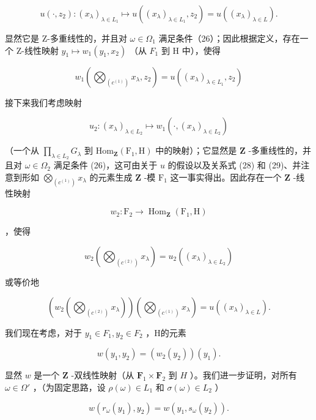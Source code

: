\[
u \left(\cdot , z _ {2}\right): \left(x _ {\lambda}\right) _ {\lambda \in L _ {1}} \mapsto u \left(\left(x _ {\lambda}\right) _ {\lambda \in L _ {1}}, z _ {2}\right) = u \left(\left(x _ {\lambda}\right) _ {\lambda \in L}\right).\tag{28}
\]

显然它是 Z-多重线性的，并且对 \(\omega\in\Omega_{1}\) 满足条件（26）；因此根据定义，存在一个 Z-线性映射 \(y_{1}\mapsto w_{1}(y_{1},x_{2})\) （从 \(F_{1}\) 到 H 中），使得

\[
w _ {1} \left(\bigotimes_ {(c ^ {(1)})} x _ {\lambda}, z _ {2}\right) = u \left(\left(x _ {\lambda}\right) _ {\lambda \in L _ {1}}, z _ {2}\right)\tag{29}
\]

接下来我们考虑映射

\[
u _ {2}: (x _ {\lambda}) _ {\lambda \in L _ {2}} \mapsto w _ {1} (\cdot , (x _ {\lambda}) _ {\lambda \in L _ {2}})
\]

（一个从 \(\prod_{\lambda \in L_2} G_\lambda\) 到 \(\mathrm{Hom}_{\mathbf{Z}}(\mathrm{F}_1, \mathrm{H})\) 中的映射）；它显然是 \(\mathbf{Z}\) -多重线性的，并且对 \(\omega \in \Omega_2\) 满足条件 (26)，这可由关于 \(u\) 的假设以及关系式 (28) 和 (29)、并注意到形如 \(\bigotimes_{(c^{(1)})} x_\lambda\) 的元素生成 \(\mathbf{Z}\) -模 \(\mathrm{F}_1\) 这一事实得出。因此存在一个 \(\mathbf{Z}\) -线性映射

\[
w _ {2}: \mathrm{F} _ {2} \rightarrow \operatorname{Hom} _ {\mathbf {Z}} (\mathrm{F} _ {1}, \mathrm{H})
\]

，使得

\[
w _ {2} \left(\bigotimes_ {(c ^ {(2)})} x _ {\lambda}\right) = u _ {2} \left(\left(x _ {\lambda}\right) _ {\lambda \in L _ {2}}\right)
\]

或等价地

\[
\left(w _ {2} \left(\bigotimes_ {(c ^ {(2)})} x _ {\lambda}\right)\right) \left(\bigotimes_ {(c ^ {(1)})} x _ {\lambda}\right) = u \left(\left(x _ {\lambda}\right) _ {\lambda \in L}\right).\tag{30}
\]

我们现在考虑，对于 \(y_{1} \in F_{1}, y_{2} \in F_{2}\) ，H的元素

\[
w (y _ {1}, y _ {2}) = (w _ {2} (y _ {2})) (y _ {1}).\tag{31}
\]

显然 \(w\) 是一个 \(\mathbf{Z}\) -双线性映射（从 \(\mathbf{F}_1 \times \mathbf{F}_2\) 到 \(H\) ）。我们进一步证明，对所有 \(\omega \in \Omega'\) ，（为固定思路，设 \(\rho(\omega) \in L_1\) 和 \(\sigma(\omega) \in L_2\) ）

\[
w (r _ {\omega} (y _ {1}), y _ {2}) = w (y _ {1}, s _ {\omega} (y _ {2})).\tag{32}
\]

